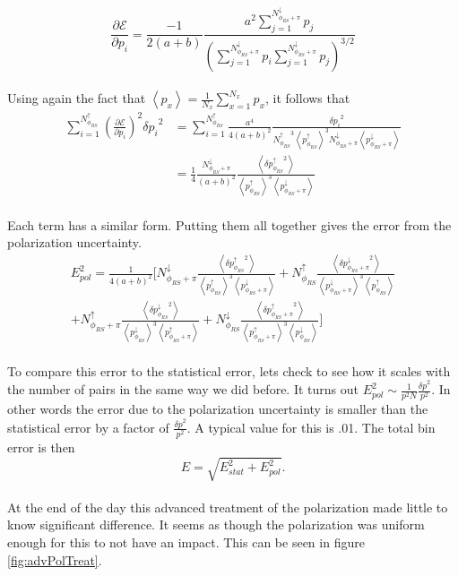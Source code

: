 \documentclass[abstract = on,listof=totoc, bibliography=totoc]{scrreprt}
\newcommand{\phirs}{\phi_{RS}}
\begin{document}
\begin{equation}
\label{eq:singleDeriv}
\frac{\partial\mathcal{E}}{\partial p_i} = \frac{-1}{2(a+b)} \frac{a^2 \sum\limits_{j=1}^{N^\downarrow_{\phirs+\pi}}p_j}{\left(\sum\limits_{j=1}^{N^\downarrow_{\phirs+\pi}}p_i \sum\limits_{j=1}^{N^\downarrow_{\phirs+\pi}} p_j\right)^{3/2}}
\end{equation}\\
%
Using again the fact that $\left<p_x\right> = \frac{1}{N_x}\sum\limits_{x=1}^{N_x} p_x$, it follows that 
\begin{align}
\sum\limits_{i=1}^{N^\uparrow_{\phirs}} \left(\frac{\partial\mathcal{E}}{\partial p_i}\right)^2 {\delta p_i}^2 &= \sum\limits_{i=1}^{N^\uparrow_{\phirs}} \frac{a^4}{4(a+b)^2} \frac{{\delta p_i}^2}{{N^\uparrow_{\phirs}}^3\left<p^\uparrow_{\phirs}\right>^3N^\downarrow_{\phirs+\pi}\left<p^\downarrow_{\phirs+\pi}\right>} \\
& = \frac{1}{4} \frac{N^\downarrow_{\phirs+\pi}}{(a+b)^2} \frac{\left<{\delta p^\uparrow_{\phirs}}^2\right>}{\left<p^\uparrow_{\phirs}\right>^3\left<p^\downarrow_{\phirs+\pi}\right>}
\end{align}\\
%
Each term has a similar form. Putting them all together gives the error from the polarization uncertainty. 
\begin{align}
E_{pol}^2 = \frac{1}{4(a+b)^2} \Biggl[ N^\downarrow_{\phirs+\pi} \frac{\left<{\delta p^\uparrow_{\phirs}}^2\right>}{\left<p^\uparrow_{\phirs}\right>^3\left<p^\downarrow_{\phirs+\pi}\right>} + N^\uparrow_{\phirs} \frac{\left<{\delta p^\downarrow_{\phirs+\pi}}^2\right>}{\left<p^\downarrow_{\phirs+\pi}\right>^3\left<p^\uparrow_{\phirs}\right>} \\ \nonumber
+  N^\uparrow_{\phirs+\pi} \frac{\left<{\delta p^\downarrow_{\phirs}}^2\right>}{\left<p^\downarrow_{\phirs}\right>^3\left<p^\uparrow_{\phirs+\pi}\right>} + N^\downarrow_{\phirs} \frac{\left<{\delta p^\uparrow_{\phirs+\pi}}^2\right>}{\left<p^\uparrow_{\phirs+\pi}\right>^3\left<p^\downarrow_{\phirs}\right>} \Biggr]
\end{align}\\
%

To compare this error to the statistical error, lets check to see how it scales with the number of pairs in the same way we did before. It turns out $E_{pol}^2 \sim \frac{1}{p^2N} \frac{{\delta p}^2}{p^2}$. In other words the error due to the polarization uncertainty is smaller than the statistical error by a factor of $\frac{{\delta p}^2}{p^2}$. A typical value for this is .01. The total bin error is then 
\begin{equation}
E = \sqrt{E_{stat}^2 + E_{pol}^2}.
\label{eq:errorAdv}
\end{equation}\\
At the end of the day this advanced treatment of the polarization made little to know significant difference. It seems as though the polarization was uniform enough for this to not have an impact. This can be seen in figure \ref{fig:advPolTreat}.  
\end{document}
